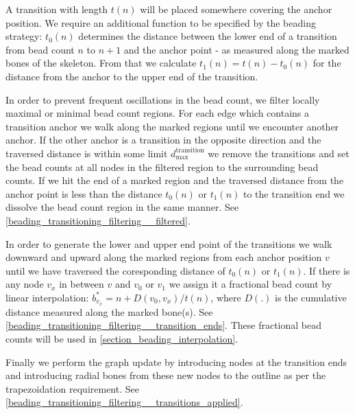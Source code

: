 A transition with length $t(n)$ will be placed somewhere covering the anchor position.
We require an additional function to be specified by the beading strategy: $t_0(n)$ determines the distance between the lower end of a transition from bead count $n$ to $n+1$ and the anchor point - as measured along the marked bones of the skeleton.
From that we calculate $t_1(n) = t(n) - t_0(n)$ for the distance from the anchor to the upper end of the transition.

In order to prevent frequent oscillations in the bead count, we filter locally maximal or minimal bead count regions.
For each edge which contains a transition anchor we walk along the marked regions until we encounter another anchor.
If the other anchor is a transition in the opposite direction and the traversed distance is within some limit $d_\text{max}^\text{transition}$ we remove the transitions and set the bead counts at all nodes in the filtered region to the surrounding bead counts.
If we hit the end of a marked region and the traversed distance from the anchor point is less than the distance $t_{0}(n)$ or $t_{1}(n)$ to the transition end we dissolve the bead count region in the same manner.
See \cref{beading_transitioning_filtering__filtered}.

In order to generate the lower and upper end point of the transitions we walk downward and upward along the marked regions from each anchor position $v$ until we have traversed the coresponding distance of $t_{0}(n)$ or $t_{1}(n)$.
If there is any node $v_x$ in between $v$ and $v_0$ or $v_1$ we assign it a fractional bead count by linear interpolation: $b^*_{v_x} = n + D(v_0, v_x)/t(n)$, where $D(.)$ is the cumulative distance measured along the marked bone(s).
See \cref{beading_transitioning_filtering__transition_ends}.
These fractional bead counts will be used in \cref{section_beading_interpolation}.

Finally we perform the graph update by introducing nodes at the transition ends and introducing radial bones from these new nodes to the outline as per the trapezoidation requirement.
See \cref{beading_transitioning_filtering__transitions_applied}.


